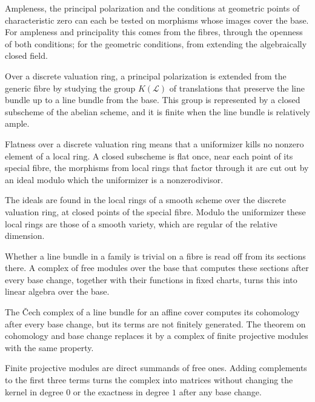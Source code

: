 Ampleness, the principal polarization and the conditions at geometric points of characteristic zero can
each be tested on morphisms whose images cover the base. For ampleness and principality this comes from
the fibres, through the openness of both conditions; for the geometric conditions, from extending the
algebraically closed field.

Over a discrete valuation ring, a principal polarization is extended from the generic fibre by studying the
group $K(\mathcal L)$ of translations that preserve the line bundle up to a line bundle from the base. This
group is represented by a closed subscheme of the abelian scheme, and it is finite when the line bundle is
relatively ample.

Flatness over a discrete valuation ring means that a uniformizer kills no nonzero element of a local ring. A
closed subscheme is flat once, near each point of its special fibre, the morphisms from local rings that factor
through it are cut out by an ideal modulo which the uniformizer is a nonzerodivisor.

The ideals are found in the local rings of a smooth scheme over the discrete valuation ring, at closed points of
the special fibre. Modulo the uniformizer these local rings are those of a smooth variety, which are regular of
the relative dimension.

Whether a line bundle in a family is trivial on a fibre is read off from its sections there. A complex of free
modules over the base that computes these sections after every base change, together with their functions in
fixed charts, turns this into linear algebra over the base.

The \v{C}ech complex of a line bundle for an affine cover computes its cohomology after every base change, but its
terms are not finitely generated. The theorem on cohomology and base change replaces it by a complex of finite
projective modules with the same property.

Finite projective modules are direct summands of free ones. Adding complements to the first three terms turns the
complex into matrices without changing the kernel in degree $0$ or the exactness in degree $1$ after any base change.


